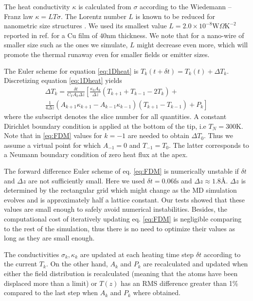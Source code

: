 \documentclass[%
 aps,
 prb,%
 amsmath,amssymb,
reprint,%
superscriptaddress,
]{revtex4-1}
\begin{document}
The heat conductivity $\kappa$ is calculated from $\sigma$ according to the Wiedemann -- Franz law $\kappa = LT\sigma$. The Lorentz number $L$ is known to be reduced for nanometric size structures \cite{Nath1974}.
We used its smallest value $L = 2.0 \times 10^{-8} \textrm{W} \Omega \textrm{K}^{-2}$ reported in ref. \cite{Nath1974} for a Cu film of $40 \textrm{nm}$ thickness. We note that for a nano-wire of smaller size such as the ones we simulate, $L$ might decrease even more, which will promote the thermal runaway even for smaller fields or emitter sizes.

The Euler scheme for equation \eqref{eq:1Dheat} is $T_k(t+\delta t) = T_k(t) + \Delta T_k$. Discretizing equation \eqref{eq:1Dheat} yields
\begin{equation}
	\label{eq:FDM}
	\begin{split}
	\Delta T_k = \frac{\delta t}{C_V A_k \Delta z} \left[ \frac{\kappa_k A_k}{\Delta z} \left( T_{k+1}+T_{k-1} - 2T_k \right) + \right. \\
	 \left. \frac{1}{4 \Delta z} \left( A_{k+1} \kappa_{k+1} - A_{k-1} \kappa_{k-1} \right) \left( T_{k+1} - T_{k-1} \right) + P_k \right]
	\end{split}
\end{equation}
where the subscript denotes the slice number for all quantities. 
A constant Dirichlet boundary condition is applied at the bottom of the tip, i.e $T_N = 300$K. Note that in \eqref{eq:FDM} values for $k=-1$ are needed to obtain $\Delta T_0$. Thus we assume a virtual point for which $A_{-1} = 0$ and $T_{-1} = T_0$. The latter corresponds to a Neumann boundary condition of zero heat flux at the apex.

The forward difference Euler scheme of eq. \eqref{eq:FDM} is numerically unstable if $\delta t$ and $\Delta z$ are not sufficiently small. Here we used $\delta t = 0.06 \textrm{fs}$ and $\Delta z \approx 1.8 \textrm{\AA}$. 
$\Delta z$ is determined by the rectangular grid which might change as the MD simulation evolves and is approximately half a lattice constant. 
Our tests showed that these values are small enough to safely avoid numerical instabilities.
Besides, the computational cost of iteratively updating eq. \eqref{eq:FDM} is negligible comparing to the rest of the simulation, thus there is no need to optimize their values as long as they are small enough.

The conductivities $\sigma_k, \kappa_k$ are updated at each heating time step $\delta t$ according to the current $T_k$. On the other hand, $A_k$ and $P_k$ are recalculated and updated when either the field distribution is recalculated (meaning that the atoms have been displaced more than a limit) or $T(z)$ has an RMS difference greater than 1\% compared to the last step when $A_k$ and $P_k$ where obtained. 
\end{document}
